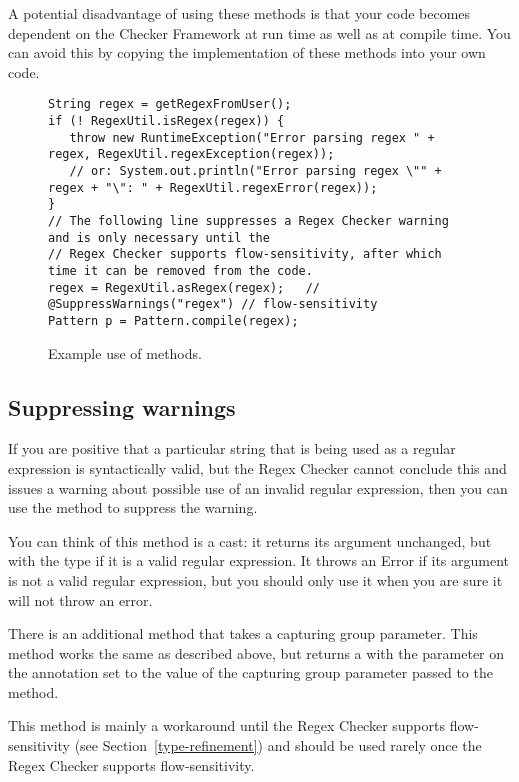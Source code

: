 A potential disadvantage of using these methods is that your code becomes
dependent on the Checker Framework at run time as well as at compile time.
You can avoid this by copying the implementation of these methods into
your own code.

\begin{figure}
\begin{smaller}
\begin{Verbatim}
String regex = getRegexFromUser();
if (! RegexUtil.isRegex(regex)) {
   throw new RuntimeException("Error parsing regex " + regex, RegexUtil.regexException(regex));
   // or: System.out.println("Error parsing regex \"" + regex + "\": " + RegexUtil.regexError(regex));
}
// The following line suppresses a Regex Checker warning and is only necessary until the 
// Regex Checker supports flow-sensitivity, after which time it can be removed from the code.
regex = RegexUtil.asRegex(regex);   // @SuppressWarnings("regex") // flow-sensitivity
Pattern p = Pattern.compile(regex);
\end{Verbatim}
\end{smaller}
\caption{Example use of  methods.}
\label{fig:regex-util-example}
\end{figure}


\subsection{Suppressing warnings}

If you are positive that a particular string that is being used as a
regular expression is syntactically valid, but the Regex Checker cannot
conclude this and issues a warning about possible use of an invalid regular
expression, then you can use the
 method to suppress the
warning.

You can think of this method 
is a cast:  it returns its argument unchanged, but with the type
 if it is a valid regular expression.  It throws an
Error if its argument is not a valid regular expression, but you should
only use it when you are sure it will not throw an error.

There is an additional 
method that takes a capturing group parameter. This method works the same as
described above, but returns a  with the parameter on the
annotation set to the value of the capturing group parameter passed to the method.

This method is
mainly a workaround until the Regex Checker supports flow-sensitivity (see
Section~\ref{type-refinement}) and should be used rarely once the Regex
Checker supports flow-sensitivity.




